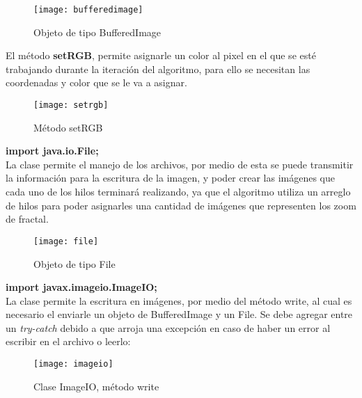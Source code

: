 \documentclass[12pt,a4paper]{article}
\begin{document}
			\begin{figure}[h]
				\centering
				\texttt{[image: bufferedimage]}
				\caption{Objeto de tipo BufferedImage}
			\end{figure}
			
			El método \textbf{setRGB}, permite asignarle un color al pixel en el que se esté trabajando durante la iteración del algoritmo, para ello se necesitan las coordenadas y  color que se le va a asignar.
			
			\begin{figure}[h]
				\centering
				\texttt{[image: setrgb]}
				\caption{Método setRGB}
			\end{figure}
			
			
			\textbf{import java.io.File;}\\
			La clase permite el manejo de los archivos, por medio de esta se puede transmitir la información para la escritura de la imagen, y poder crear las imágenes que cada uno de los hilos terminará realizando, ya que el algoritmo utiliza un arreglo de hilos para poder asignarles una cantidad de imágenes que representen los zoom de fractal. 
			\begin{figure}[h]
				\centering
				\texttt{[image: file]}
				\caption{Objeto de tipo File}
			\end{figure}
						
			\textbf{import javax.imageio.ImageIO;}\\
			La clase permite la escritura en imágenes, por medio del método write, al cual es necesario el enviarle un objeto de BufferedImage y un File. Se debe agregar entre un \textit{try-catch} debido a que arroja una excepción en caso de haber un error al escribir en el archivo o leerlo:
			\begin{figure}[H]
				\centering
				\texttt{[image: imageio]}
				\caption{Clase ImageIO, método write}
			\end{figure}
			
\end{document}
